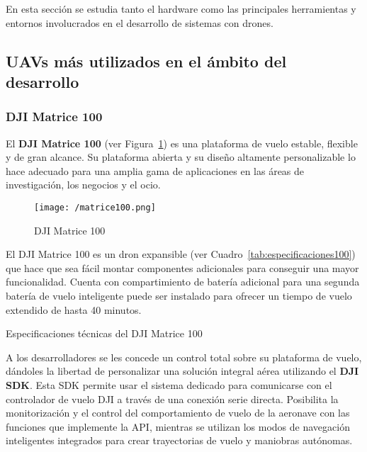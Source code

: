 En esta sección se estudia tanto el hardware como las principales herramientas y entornos involucrados en el desarrollo de sistemas con drones.

\subsection{UAVs más utilizados en el ámbito del desarrollo}
\label{sec:uavdesarrollo}

\subsubsection{DJI Matrice 100}
\label{sec:matrice100}

El \textbf{DJI Matrice 100} (ver Figura~\ref{fig:matrice100}) es una plataforma de vuelo estable, flexible y de gran alcance. Su plataforma abierta y su diseño altamente personalizable lo hace adecuado para una amplia gama de aplicaciones en las áreas de investigación, los negocios y el ocio.

\begin{figure}[!h]
\begin{center}
\texttt{[image: /matrice100.png]}
\caption[DJI Matrice 100]{DJI Matrice 100}
\label{fig:matrice100}
\end{center}
\end{figure}

El DJI Matrice 100 es un dron expansible (ver Cuadro~\ref{tab:especificaciones100}) que hace que sea fácil montar componentes adicionales para conseguir una mayor funcionalidad. Cuenta con compartimiento de batería adicional para una segunda batería de vuelo inteligente puede ser instalado para ofrecer un tiempo de vuelo extendido de hasta 40 minutos.

\begin{table}[!h]
 \centering
 {\small
 
 }
 \caption[Especificaciones técnicas del DJI Matrice 100]
 {Especificaciones técnicas del DJI Matrice 100 \cite{especifacionesmatrice100}}
 \label{tab:especificaciones100}
\end{table}

A los desarrolladores se les concede un control total sobre su plataforma de vuelo, dándoles la libertad de personalizar una solución integral aérea utilizando el \textbf{DJI \acs{SDK}}. Esta \acs{SDK} permite usar el sistema dedicado para comunicarse con el controlador de vuelo DJI a través de una conexión serie directa. Posibilita la monitorización y el control del comportamiento de vuelo de la aeronave con las funciones que implemente la \acs{API}, mientras se utilizan los modos de navegación inteligentes integrados para crear trayectorias de vuelo y maniobras autónomas.

